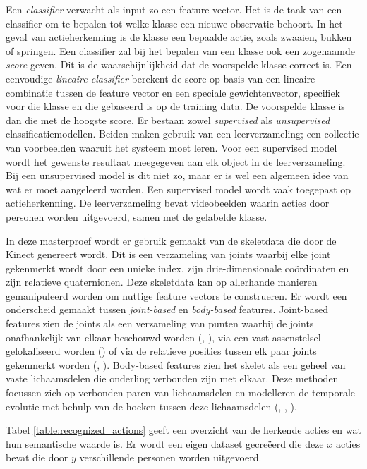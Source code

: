 Een \textit{classifier} verwacht als input zo een feature vector. Het is de taak van een classifier om te bepalen tot welke klasse een nieuwe observatie behoort. In het geval van actieherkenning is de klasse een bepaalde actie, zoals zwaaien, bukken of springen. Een classifier zal bij het bepalen van een klasse ook een zogenaamde \textit{score} geven. Dit is de waarschijnlijkheid dat de voorspelde klasse correct is. Een eenvoudige \textit{lineaire classifier} berekent de score op basis van een lineaire combinatie tussen de feature vector en een speciale gewichtenvector, specifiek voor die klasse en die gebaseerd is op de training data. De voorspelde klasse is dan die met de hoogste score. Er bestaan zowel \textit{supervised} als \textit{unsupervised} classificatiemodellen. Beiden maken gebruik van een leerverzameling; een collectie van voorbeelden waaruit het systeem moet leren. Voor een supervised model wordt het gewenste resultaat meegegeven aan elk object in de leerverzameling. Bij een unsupervised model is dit niet zo, maar er is wel een algemeen idee van wat er moet aangeleerd worden. Een supervised model wordt vaak toegepast op actieherkenning. De leerverzameling bevat videobeelden waarin acties door personen worden uitgevoerd, samen met de gelabelde klasse.


In deze masterproef wordt er gebruik gemaakt van de skeletdata die door de Kinect genereert wordt. Dit is een verzameling van joints waarbij elke joint gekenmerkt wordt door een unieke index, zijn drie-dimensionale coördinaten en zijn relatieve quaternionen. Deze skeletdata kan op allerhande manieren gemanipuleerd worden om nuttige feature vectors te construeren. Er wordt een onderscheid gemaakt tussen \textit{joint-based} en \textit{body-based} features. Joint-based features zien de joints als een verzameling van punten waarbij de joints onafhankelijk van elkaar beschouwd worden (\cite{Hussein2011}, \cite{Lv2006}), via een vast assenstelsel gelokaliseerd worden (\cite{Xia2012}) of via de relatieve posities tussen elk paar joints gekenmerkt worden (\cite{Wang2012b}, \cite{Yang2012}). Body-based features zien het skelet als een geheel van vaste lichaamsdelen die onderling verbonden zijn met elkaar. Deze methoden focussen zich op verbonden paren van lichaamsdelen en modelleren de temporale evolutie met behulp van de hoeken tussen deze lichaamsdelen (\cite{Ofli2012}, \cite{Ohn-Bar2013}, \cite{Deboeverie2016}). 


Tabel \ref{table:recognized_actions} geeft een overzicht van de herkende acties en wat hun semantische waarde is. Er wordt een eigen dataset gecreëerd die deze $x$ acties bevat die door $y$ verschillende personen worden uitgevoerd.


